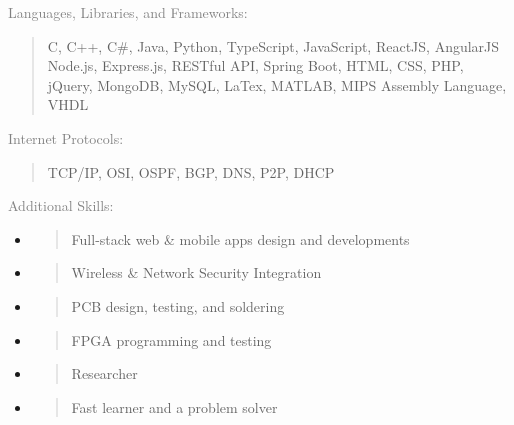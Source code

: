 \documentclass[letterpage]{article}
\begin{document}
\begin{minipage}[t]{0.424\linewidth}
  \vspace{7px}
  \textcolor{gray}{Languages, Libraries, and Frameworks:} \\ 
  \begin{quote}
    \textmd{C, C++, C\#, Java, Python, TypeScript, JavaScript, ReactJS, AngularJS Node.js, Express.js, RESTful API, Spring Boot,  HTML, CSS, PHP, jQuery,
    MongoDB, MySQL, LaTex, MATLAB, MIPS Assembly
    Language, VHDL}\\
  \end{quote}

  \vspace{7px}
  \textcolor{gray}{Internet Protocols:}  \\
  \begin{quote}
      \textmd{TCP/IP, OSI, OSPF, BGP, DNS, P2P, DHCP}\\
  \end{quote}

  \vspace{7px}
  \textcolor{gray}{Additional Skills:}  \\
  \begin{itemize}[leftmargin=*,labelindent=0mm,labelsep=0mm]
    \raggedright
  \item
    \begin{quote}
        \textmd{Full-stack web \& mobile apps design and developments}
    \end{quote}
  \item
    \begin{quote}      
        \textmd{Wireless \&  Network Security Integration}
    \end{quote}
  \item
    \begin{quote}
        \textmd{PCB design, testing, and soldering}
    \end{quote}
  \item
    \begin{quote}
        \textmd{FPGA programming and testing}
    \end{quote}
  \item
    \begin{quote}
        \textsf{Researcher}
    \end{quote}
  \item
    \begin{quote}
        \textmd{Fast learner and a problem solver}
    \end{quote}
  \end{itemize}
\end{minipage}
\end{document}
